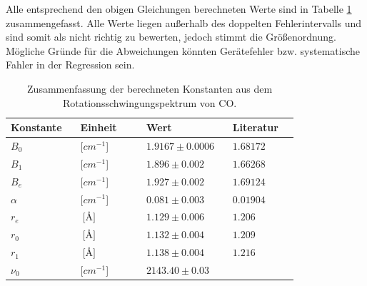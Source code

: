 Alle entsprechend den obigen Gleichungen berechneten Werte sind in Tabelle \ref{Zusammenfassung} zusammengefasst. Alle Werte liegen außerhalb des doppelten Fehlerintervalls und sind somit als nicht richtig zu bewerten, jedoch stimmt die Größenordnung. Mögliche Gründe für die Abweichungen könnten Gerätefehler bzw. systematische Fahler in der Regression sein.

\begin{table}
\label{Zusammenfassung}
	\caption{Zusammenfassung der berechneten Konstanten aus dem Rotationsschwingungspektrum von CO.  }
\begin{tabular}{C{0.2\linewidth}|C{0.2\linewidth}|C{0.2\linewidth}|C{0.2\linewidth}}
Konstante             & Einheit                  & Wert                           & Literatur \\ \hline
$B_0$                  & [$cm^{-1}$]          & $1.9167 \pm 0.0006$	& $1.68172$   \\
$B_1$                  & [$cm^{-1}$]          & $1.896 \pm 0.002$   	& $1.66268$   \\
$B_e $                 & [$cm^{-1}$]          & $1.927 \pm 0.002$   	& $1.69124$   \\
$\alpha$		& [$cm^{-1}$]       & $0.081 \pm 0.003$   	& $0.01904$   \\
$r_e$                  & $\SI{}{[\angstrom]}$		& $1.129 \pm 0.006 $  	& $1.206$     \\
$r_0$                  & $\SI{}{[\angstrom]} $		& $1.132 \pm 0.004$  	 & $1.209$     \\
$r_1$                  & $\SI{}{[\angstrom]}$ 		& $1.138 \pm 0.004$  	 & $1.216$    \\
$\nu_0$	&[$cm^{-1}$]          & $2143.40 \pm 0.03$&
\end{tabular}
\end{table}



